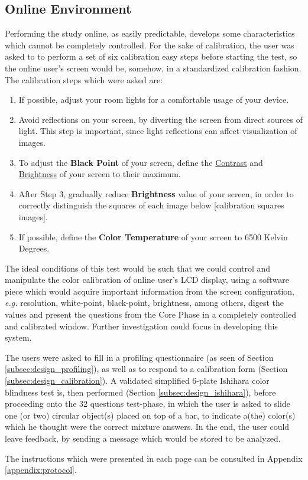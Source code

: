 \subsection{Online Environment}
%
Performing the study online, as easily predictable, develops some characteristics which cannot be completely controlled. For the sake of calibration, the user was asked to
to perform a set of six calibration easy steps before starting the test, so the online user's screen would be,
somehow, in a standardized calibration fashion. The calibration steps which were asked are:
%
\begin{enumerate}
  \item If possible, adjust your room lights for a comfortable usage of your device.
  \item Avoid reflections on your screen, by diverting the screen from direct sources of light. This step is important,
  since light reflections can affect visualization of images.
  \item To adjust the \textbf{Black Point} of your screen, define the \ul{Contrast} and \ul{Brightness} of your screen to their maximum.
  \item After Step 3, gradually reduce \textbf{Brightness} value of your screen, in order to correctly distinguish the squares of each image below [calibration squares images].
  \item If possible, define the \textbf{Color Temperature} of your screen to 6500 Kelvin Degrees.
\end{enumerate} \par
%
The ideal conditions of this test would be such that we could control and manipulate the color calibration of online user's LCD display, using a software
piece which would acquire important information from the screen configuration, \emph{e.g.} resolution, white-point, black-point, brightness, among others,
digest the values and present the questions from the Core Phase in a completely controlled and calibrated window. Further investigation could focus in
developing this system. \par
%
The users were asked to fill in a profiling questionnaire (as seen of Section \ref{subsec:design_profiling}), as well as to respond to a calibration form
(Section \ref{subsec:design_calibration}). A validated simplified 6-plate Ishihara color blindness test \cite{Alwis1992} is, then performed
(Section \ref{subsec:design_ishihara}), before proceeding onto the 32 questions test-phase, in which the user is asked to slide one (or two) circular
object(s) placed on top of a bar, to indicate a(the) color(s) which he thought were the correct mixture answers. In the end, the user could leave
feedback, by sending a message which would be stored to be analyzed. \par
%
The instructions which were presented in each page can be consulted in Appendix \ref{appendix:protocol}.
%
